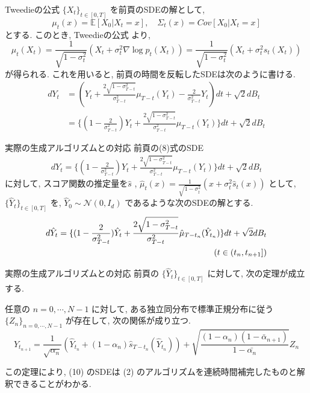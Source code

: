 \documentclass[11pt]{beamer}
\theoremstyle{plain}
\theoremstyle{definition}
\renewcommand{\cite}[1]{\citep{#1}}
\begin{document}
    \begin{frame}{Tweedieの公式}
      $\{X_t\}_{t\in[0,T]}$ を前頁のSDEの解として, 
      \begin{equation}
          \mu_t(x)=\mathbb{E}[X_0|X_t=x], \quad \Sigma_t(x)=Cov[X_0|X_t=x]
      \end{equation}
      とする. このとき, Tweedieの公式 \cite{efron_2011_tweedie} より, 
      \begin{equation}
          \mu_t(X_t)=\frac{1}{\sqrt{1-\sigma^2_t}}(X_t+\sigma^2_t\nabla \log{p_t(X_t)})=\frac{1}{\sqrt{1-\sigma^2_t}}(X_t+\sigma^2_ts_t(X_t))
      \end{equation}
      が得られる.
      これを用いると, 前頁の時間を反転したSDEは次のように書ける.
      \begin{align}
          dY_t&=(Y_t+\frac{2\sqrt{1-\sigma^2_{T-t}}}{\sigma^2_{T-t}}\mu_{T-t}(Y_t)-\frac{2}{\sigma^2_{T-t}}Y_t)dt+\sqrt{2}dB_t\\
          &=\{(1-\frac{2}{\sigma^2_{T-t}})Y_t+\frac{2\sqrt{1-\sigma^2_{T-t}}}{\sigma^2_{T-t}}\mu_{T-t}(Y_t)\}dt+\sqrt{2}dB_t
      \end{align}
    \end{frame}
    \begin{frame}{実際の生成アルゴリズムとの対応}
      前頁の(8)式のSDE
      \begin{align}
          dY_t=\{(1-\frac{2}{\sigma^2_{T-t}})Y_t+\frac{2\sqrt{1-\sigma^2_{T-t}}}{\sigma^2_{T-t}}\mu_{T-t}(Y_t)\}dt+\sqrt{2}dB_t
      \end{align}
      に対して, スコア関数の推定量を$\hat{s}$ , $\hat{\mu}_t(x)=\frac{1}{\sqrt{1-\sigma^2_t}}(x+\sigma^2_t\hat{s}_t(x))$ として, $\{\hat{Y}_t\}_{t\in[0,T]}$ を, $\hat{Y}_0\sim \mathcal{N}(0,I_d)$ であるような次のSDEの解とする.
      \begin{align}
          d\hat{Y}_t=\{(1-\frac{2}{\sigma^2_{T-t}})\hat{Y}_t+\frac{2\sqrt{1-\sigma^2_{T-t}}}{\sigma^2_{T-t}}\hat{\mu}_{T-t_n}(\hat{Y}_{t_n})\}dt+\sqrt{2}dB_t \notag\\
          (t\in (t_n,t_{n+1}])
      \end{align}
    \end{frame}
    \begin{frame}{実際の生成アルゴリズムとの対応}
      前頁の $\{\hat{Y}_t\}_{t\in[0,T]}$  に対して, 次の定理が成立する.
      \begin{theorem}
          任意の $n=0,\cdots, N-1$ に対して, ある独立同分布で標準正規分布に従う $\{Z_n\}_{n=0,\cdots, N-1}$ が存在して, 次の関係が成り立つ.
          \begin{equation}
            \hat{Y}_{t_{n+1}}=\frac{1}{\sqrt{\alpha_n}}(\hat{Y}_{t_n}+(1-\alpha_n)\hat{s}_{T-t_n}(\hat{Y}_{t_n}))+\sqrt{\frac{(1-\alpha_n)(1-\bar{\alpha}_{n+1})}{1-\bar{\alpha_n}}}Z_n
          \end{equation}
      \end{theorem}
      この定理により, (10) のSDEは (2) のアルゴリズムを連続時間補完したものと解釈できることがわかる.
    \end{frame}
\end{document}
